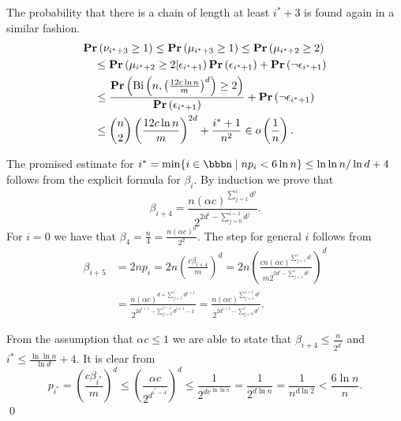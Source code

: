 The probability that there is a chain of length at least $i^* + 3$ is found again in a similar fashion.
\[
\begin{split}
& \mathbf{Pr}\left(\nu_{i^* + 3} \geq 1\right)
	\leq \mathbf{Pr}\left(\mu_{i^* + 3} \geq 1\right) \leq \mathbf{Pr}\left(\mu_{i^* + 2} \geq 2\right) \\
	& \quad \leq \mathbf{Pr}\left(\mu_{i^* + 2} \geq 2 | \epsilon_{i^* + 1}\right)\mathbf{Pr}\left(\epsilon_{i^* + 1}\right) + \mathbf{Pr}\left(\neg \epsilon_{i^* + 1}\right) \\
	& \quad \leq \frac{\mathbf{Pr}\left(\mathrm{Bi}\left(n, \left(\frac{12 c \ln n}{m}\right) ^ d\right) \geq 2\right)}{\mathbf{Pr}\left(\epsilon_{i^* + 1}\right)} + \mathbf{Pr}\left(\neg \epsilon_{i^* + 1}\right) \\
	& \quad \leq \binom{n}{2} \left(\frac{12 c \ln n}{m}\right) ^ {2d} + \frac{i^* + 1}{n ^ 2} \in o\left(\frac{1}{n}\right) \textit{.}
\end{split}
\]

The promised estimate for $i^* = \displaystyle\min \{i \in \bbbn \setdelim np_i < 6 \ln n\} \leq \ln \ln n / \ln d + 4$ follows from the explicit formula for $\beta_i$. By induction we prove that $$\beta_{i + 4} = \frac{n \left(\alpha c\right) ^ {\sum_{j = 1}^{i}d ^ j}}{2 ^ {2 d ^ i - \sum_{j = 0}^{i - 1}{d ^ j}}} \textit{.}$$ For $i = 0$ we have that $\beta_4 = \frac{n}{4} = \frac{n\left(\alpha c\right) ^ 0}{2 ^ {2}}$. The step for general $i$ follows from
\[
\begin{split}
\beta_{i + 5} 
	& = 2np_i = 2n \left(\frac{c\beta_{i + 4}}{m}\right) ^ d = 2n \left(\frac{cn\left(\alpha c\right) ^ {\sum_{j = 1}^{i}d ^ j}}{m 2 ^ {2 d ^ i - \sum_{j = 1}^{i}d^j}}\right) ^ d \\
	& = \frac{n\left(\alpha c\right) ^ {d + \sum_{j = 1}^{i} d ^ {j + 1}}}{2 ^ {2d ^ {i + 1} - \sum_{j = 0}^{i  -1} d ^ {j + 1} - 1}} = \frac{n \left(\alpha c\right) ^ {\sum_{j = 1}^{i + 1} d ^ j}}{2 ^ {2d ^ {i + 1} - \sum_{j = 0}^{i} d ^ j}} \textit{.}
\end{split}
\]

From the assumption that $\alpha c \leq 1$ we are able to state that $\beta_{i + 4} \leq \frac{n}{2 ^ {d ^ i}}$ and $i^* \leq \frac{\ln \ln n}{\ln d} + 4$. It is clear from
\[
p_{i^*} = \left(\frac{c\beta_{i^*}}{m}\right) ^ d \leq \left(\frac{\alpha c}{2 ^ {d ^ {i^* - 4}}}\right) ^ d \leq \frac{1}{2 ^ {de^{\ln \ln n}}} = \frac{1}{2 ^ {d \ln n}} = \frac{1}{n ^ {d \ln 2}} < \frac{6 \ln n}{n}.
\]
\qed
